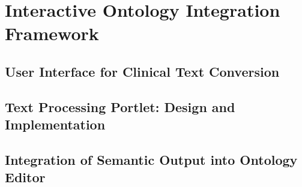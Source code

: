 \documentclass[12pt, a4paper]{article}
\begin{document}
\section{Interactive Ontology Integration Framework}
    \subsection{User Interface for Clinical Text Conversion}
    \subsection{Text Processing Portlet: Design and Implementation}
    \subsection{Integration of Semantic Output into Ontology Editor}
\end{document}

